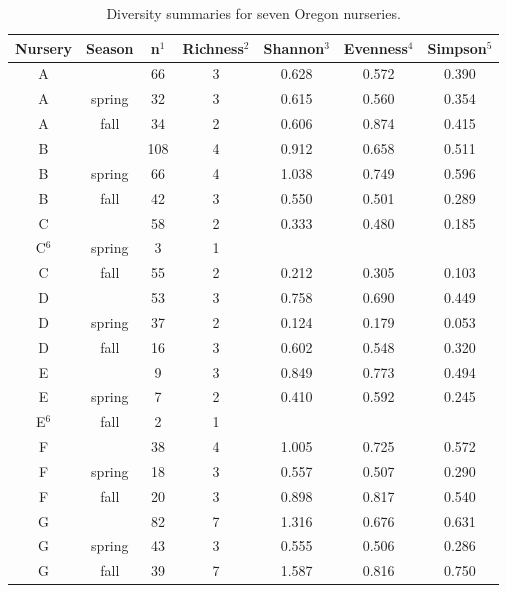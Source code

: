 \documentclass[12pt]{article}
\begin{document}
\begin{table}[ht]
\centering
\caption{Diversity summaries for seven Oregon nurseries.}
\label{tab:div}
\begin{tabular}{ccccccc}
  \hline
 \textbf{Nursery} &  \textbf{Season} & \textbf{n}$^{1}$ & \textbf{Richness}$^{2}$ & \textbf{Shannon}$^{3}$ & \textbf{Evenness}$^{4}$ & \textbf{Simpson}$^{5}$ \\ 
  \hline
  \rowcolor{gray!20}
  A & & 66 & 3 & 0.628 & 0.572 & 0.390 \\ 
  A & spring & 32 & 3 & 0.615 & 0.560 & 0.354 \\ 
  A & fall & 34 & 2 & 0.606 & 0.874 & 0.415 \\ 
\rowcolor{gray!20}
  B & & 108 & 4 & 0.912 & 0.658 & 0.511 \\ 
  B & spring & 66 & 4 & 1.038 & 0.749 & 0.596 \\ 
  B & fall & 42 & 3 & 0.550 & 0.501 & 0.289 \\ 
\rowcolor{gray!20}
  C & & 58 & 2 & 0.333 & 0.480 & 0.185 \\ 
  C$^{6}$ & spring & 3 & 1 &  &  &  \\ 
  C & fall & 55 & 2 & 0.212 & 0.305 & 0.103 \\ 
  \rowcolor{gray!20}
  D & & 53 & 3 & 0.758 & 0.690 & 0.449 \\ 
  D & spring & 37 & 2 & 0.124 & 0.179 & 0.053 \\ 
  D & fall & 16 & 3 & 0.602 & 0.548 & 0.320 \\ 
  \rowcolor{gray!20}
  E & & 9 & 3 & 0.849 & 0.773 & 0.494 \\ 
  E & spring & 7 & 2 & 0.410 & 0.592 & 0.245 \\ 
  E$^{6}$ & fall & 2 & 1 &  &  &  \\ 
  \rowcolor{gray!20}
  F & & 38 & 4 & 1.005 & 0.725 & 0.572 \\ 
  F & spring & 18 & 3 & 0.557 & 0.507 & 0.290 \\ 
  F & fall & 20 & 3 & 0.898 & 0.817 & 0.540 \\ 
  \rowcolor{gray!20}
  G & & 82 & 7 & 1.316 & 0.676 & 0.631 \\ 
  G & spring & 43 & 3 & 0.555 & 0.506 & 0.286 \\ 
  G & fall & 39 & 7 & 1.587 & 0.816 & 0.750 \\ 
  \hline
\end{tabular}

\end{table}
\end{document}
